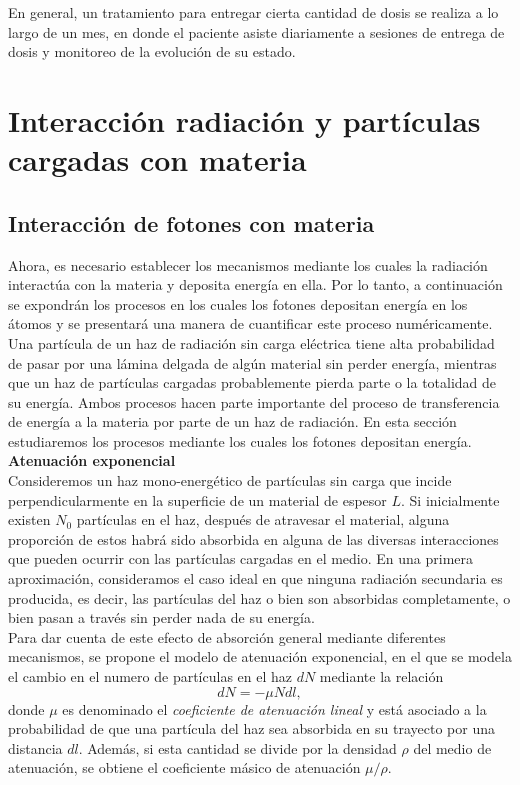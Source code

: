En general, un tratamiento para entregar cierta cantidad de dosis se realiza a lo largo de un mes, en donde el paciente asiste diariamente a sesiones de entrega de dosis y monitoreo de la evolución de su estado. \\    

\section{Interacción radiación y partículas cargadas con materia}
\subsection{Interacción de fotones con materia}
Ahora, es necesario establecer los mecanismos mediante los cuales la radiación interactúa con la materia y deposita energía en ella. Por lo tanto, a continuación se expondrán los procesos en los cuales los fotones depositan energía en los átomos y se presentará una manera de cuantificar este proceso numéricamente.  \\

Una partícula de un haz de radiación sin carga eléctrica tiene alta probabilidad de pasar por una lámina delgada de algún material sin perder energía, mientras que un haz de partículas cargadas probablemente pierda parte o la totalidad de su energía. Ambos procesos hacen parte importante del proceso de transferencia de energía a la materia por parte de un haz de radiación. En esta sección estudiaremos los procesos mediante los cuales los fotones depositan energía.\\

\noindent
\textbf{Atenuación exponencial}\\


Consideremos un haz mono-energético de partículas sin carga que incide perpendicularmente en la superficie de un material de espesor $L$. Si inicialmente existen $N_0$ partículas en el haz, después de atravesar el material, alguna proporción de estos habrá sido absorbida en alguna de las diversas interacciones que pueden ocurrir con las partículas cargadas en el medio. En una primera aproximación, consideramos el caso ideal en que ninguna radiación secundaria es producida, es decir, las partículas del haz o bien son absorbidas completamente, o bien pasan a través sin perder nada de su energía.\\

Para dar cuenta de este efecto de absorción general mediante diferentes mecanismos, se propone el modelo de atenuación exponencial, en el que se modela el cambio en el numero de partículas en el haz $dN$ mediante la relación
\begin{equation}
	dN=-\mu N dl,
\end{equation}  
donde $\mu$ es denominado el \textit{coeficiente de atenuación lineal} y está asociado a la probabilidad de que una partícula del haz sea absorbida en su trayecto por una distancia $dl$. Además, si esta cantidad se divide por la densidad $\rho$ del medio de atenuación, se obtiene el coeficiente másico de atenuación $\mu/\rho$.\\

